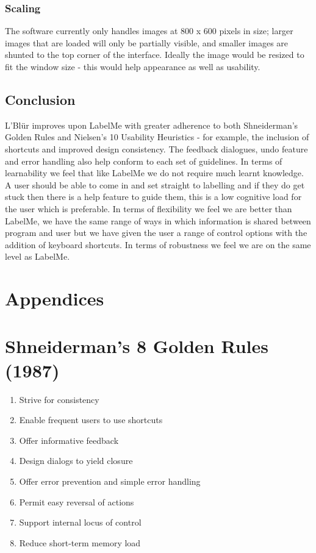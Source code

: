\documentclass[a4paper,11pt,oneside]{article}
\begin{document}
\subsubsection{Scaling}
The software currently only handles images at 800 x 600 pixels in size;
larger images that are loaded will only be partially visible, and smaller
images are shunted to the top corner of the interface. Ideally the image would
be resized to fit the window size - this would help appearance as well as
usability.


\subsection{Conclusion}
L'Bl\"{u}r improves upon LabelMe with greater adherence to both Shneiderman's
Golden Rules and Nielsen's 10 Usability Heuristics - for example,
the inclusion of shortcuts and improved design consistency. The feedback
dialogues, undo feature and error handling also help conform to each set of
guidelines.  In terms of learnability we feel that like LabelMe we do not
require much learnt knowledge.  A user should be able to come in and set 
straight to labelling and if they do get stuck then there is a help feature to
guide them, this is a low cognitive load for the user which is preferable.
In terms of flexibility we feel we are better than LabelMe, we have
the same range of ways in which information is shared between program and user
but we have given the user a range of control options with the addition of
keyboard shortcuts.  In terms of robustness we feel we are on the same level as
LabelMe.

\section{Appendices}
\appendix

\section{Shneiderman’s 8 Golden Rules (1987)}
\begin{enumerate}
\item Strive for consistency
\item Enable frequent users to use shortcuts
\item Offer informative feedback
\item Design dialogs to yield closure
\item Offer error prevention and simple error handling
\item Permit easy reversal of actions
\item Support internal locus of control
\item Reduce short-term memory load 
\end{enumerate}
\end{document}
